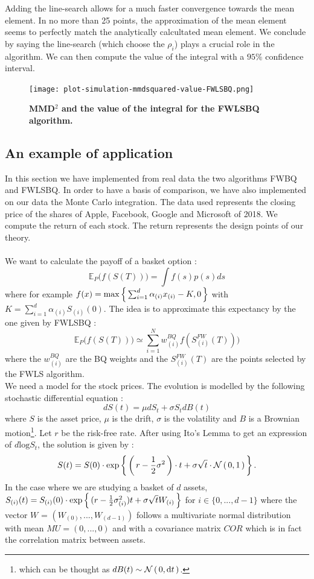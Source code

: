 Adding the line-search allows for a much faster convergence towards the mean element. In no more than 25 points, the approximation of the mean element seems to perfectly match the analytically calcultated mean element. We conclude by saying the line-search (which choose the $\rho_{i}$) plays a crucial role in the algorithm.
We can then compute the value of the integral with a $95\%$ confidence interval.
\begin{figure}[H]
\begin{center}
	\texttt{[image: plot-simulation-mmdsquared-value-FWLSBQ.png]}
	\caption{\textbf{MMD$^2$ and the value of the integral for the FWLSBQ algorithm.}}
\end{center}
\end{figure}

\subsection{An example of application}
In this section we have implemented from real data the two algorithms FWBQ and FWLSBQ. In order to have a basis of comparison, we have also implemented on our data the Monte Carlo integration. The data used represents the closing price of the shares of Apple, Facebook, Google and Microsoft of 2018. We compute the return of each stock. The return represents the design points of our theory. \\ \\
We want to calculate the payoff of a basket option : $$ \mathbb{E}_P \Big( f(S(T)) \Big) = \int f(s) p(s) ds $$ where for example $f(x) = \max \left \{ \,  \sum_{i = 1}^{d} \alpha_{(i)} x_{(i)} - K, 0 \, \right \} $ with $K = \sum_{i = 1}^{d} \alpha_{(i)} S_{(i)}(0) $. The idea is to approximate this expectancy by the one given by FWLSBQ : $$ \mathbb{E}_P \Big( f(S(T)) \Big) \simeq \sum_{i = 1}^{N} w_{(i)}^{BQ} f(S_{(i)}^{FW}(T))) $$ where the $w_{(i)}^{BQ}$ are the BQ weights and the $S_{(i)}^{FW}(T)$ are the points selected by the FWLS algorithm. \\
We need a model for the stock prices. The evolution is modelled by the following stochastic differential equation : $$ dS(t) = \mu dS_t + \sigma S_t dB(t) $$ where $S$ is the asset price, $\mu$ is the drift, $\sigma$ is the volatility and $B$ is a Brownian motion\footnote{which can be thought as $dB(t) \sim \mathcal{N}\left( \, 0, \mathop{}\mathopen{}\mathrm{d}{}t \, \right)$.}. Let $r$ be the risk-free rate. After using Ito's Lemma to get an expression of $d\text{log}S_t$, the solution is given by : $$S(t) = S(0) \cdot \exp \left \{ \, \left( \, r-\frac{1}{2}\sigma^2 \, \right)\cdot t + \sigma \sqrt{t} \cdot \mathcal{N}\left( \, 0, 1 \, \right)  \, \right \}.$$ In the case where we are studying a basket of $d$ assets, $S_{(i)}(t) = S_{(i)}(0) \cdot \exp \left \{ \, (r-\frac{1}{2}\sigma_{(i)}^2)t + \sigma \sqrt{t} W_{(i)}  \, \right \}$ for $i \in \{0, ..., d-1\}$ where the vector $W$ = $(W_{(0)}, ..., W_{(d-1)})$ follows a multivariate normal distribution with mean $MU = (0, ..., 0)$ and with a covariance matrix $COR$ which is in fact the correlation matrix between assets. \\
